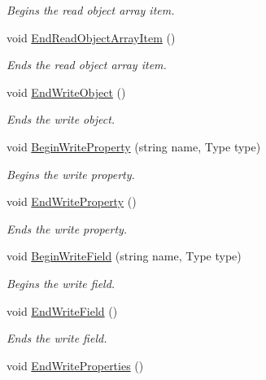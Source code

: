 \begin{DoxyCompactItemize}
\begin{DoxyCompactList}\small\item\em Begins the read object array item. \end{DoxyCompactList}\item 
void \hyperlink{class_serialization_1_1_binary_serializer_a3a649cab5370bcfe131307bcaf9156d2}{End\+Read\+Object\+Array\+Item} ()
\begin{DoxyCompactList}\small\item\em Ends the read object array item. \end{DoxyCompactList}\item 
void \hyperlink{class_serialization_1_1_binary_serializer_afa2c3e312cbe5f67a4b963cb0dadaa75}{End\+Write\+Object} ()
\begin{DoxyCompactList}\small\item\em Ends the write object. \end{DoxyCompactList}\item 
void \hyperlink{class_serialization_1_1_binary_serializer_adbfae0ca57e2c848c4efa0ae23b25e62}{Begin\+Write\+Property} (string name, Type type)
\begin{DoxyCompactList}\small\item\em Begins the write property. \end{DoxyCompactList}\item 
void \hyperlink{class_serialization_1_1_binary_serializer_a481fce2c7372e97a46ab15316c33a395}{End\+Write\+Property} ()
\begin{DoxyCompactList}\small\item\em Ends the write property. \end{DoxyCompactList}\item 
void \hyperlink{class_serialization_1_1_binary_serializer_a33ed72f54b3502aa05c62bf777027fde}{Begin\+Write\+Field} (string name, Type type)
\begin{DoxyCompactList}\small\item\em Begins the write field. \end{DoxyCompactList}\item 
void \hyperlink{class_serialization_1_1_binary_serializer_a3fa0ec1f937e4009887ea69b42461c04}{End\+Write\+Field} ()
\begin{DoxyCompactList}\small\item\em Ends the write field. \end{DoxyCompactList}\item 
void \hyperlink{class_serialization_1_1_binary_serializer_af242d8344e351d53f4cb1dca1f0d321c}{End\+Write\+Properties} ()

\end{DoxyCompactItemize}
